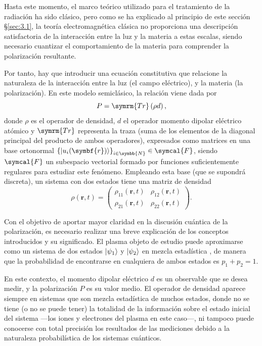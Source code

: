 Hasta este momento, el marco teórico utilizado para el tratamiento de la radiación ha sido clásico, pero como se ha explicado al principio de este sección \S\ref{sec:3.1}, la teoría electromagnética clásica no proporciona una descripción satisfactoria \autocite{griffithsIntroductionElectrodynamics2017} de la interacción entre la luz y la materia a estas escalas, siendo necesario cuantizar el comportamiento de la materia para comprender la polarización resultante.

Por tanto, hay que introducir una ecuación constitutiva que relacione la naturaleza de la interacción entre la luz (el campo eléctrico), y la materia (la polarización). En este modelo semiclásico, la relación \autocite{cohen-tannoudjiQuantumMechanicsVolume2019} viene dada por
\begin{equation}\label{eq:3.14}
  P = \symrm{Tr} \left(\rho d \right),
\end{equation}
donde $\rho$ es el operador de densidad, $d$ el operador momento dipolar eléctrico atómico y $\symrm{Tr}$ representa la traza (suma de los elementos de la diagonal principal del producto de ambos operadores), expresados como matrices en una base ortonormal $\left\{\ket{u_{i}(\symbf{r})}\right\}_{i \in \symbb{N}} \in \symcal{F}$, siendo $\symcal{F}$ un subespacio vectorial \autocite{cohen-tannoudjiQuantumMechanicsVolume2019} formado por funciones suficientemente regulares para estudiar este fenómeno. Empleando esta base (que se supondrá discreta), un sistema con dos estados tiene una matriz de densidad
\begin{equation}\label{eq:3.15}
  \rho(\symbf{r},t) = 
  \begin{pmatrix}
    \rho_{11}(\symbf{r},t) & \rho_{12}(\symbf{r},t) \\
    \rho_{21}(\symbf{r},t) & \rho_{22}(\symbf{r},t)
  \end{pmatrix}.
\end{equation}

Con el objetivo de aportar mayor claridad en la discusión cuántica de la polarización, es necesario realizar una breve explicación de los conceptos introducidos y su significado. El plasma objeto de estudio puede aproximarse \autocite{milonniLasers1988} como un sistema de dos estados $\left|\psi_{1}\right\rangle$ y $\left|\psi_{2}\right\rangle$ en mezcla estadística \autocite{cohen-tannoudjiQuantumMechanicsVolume2019}, de manera que la probabilidad de encontrarse en cualquiera de ambos estados es $p_{1} + p_{2} = 1$.

En este contexto, el momento dipolar eléctrico $d$ es un observable que se desea medir, y la polarización $P$ es su valor medio. El operador de densidad aparece siempre en sistemas que son mezcla estadística de muchos estados, donde no se tiene (o no se puede tener) la totalidad de la información sobre el estado inicial del sistema ---los iones y electrones del plasma en este caso---, ni tampoco puede conocerse con total precisión los resultados de las mediciones debido a la naturaleza probabilística de los sistemas cuánticos. 

